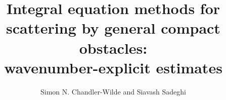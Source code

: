 \documentclass{birkjour}
\theoremstyle{definition}
\theoremstyle{remark}
\numberwithin{equation}{section}
\begin{document}
\title[Wavenumber-explicit estimates in scattering]{Integral equation methods for\\scattering by general compact obstacles:\\ wavenumber-explicit estimates}
\author[S. N. Chandler-Wilde and S. Sadeghi]{Simon N. Chandler-Wilde and Siavash Sadeghi}
\address{Department of Mathematics and Statistics,\\ University of Reading,\\ Whiteknights PO Box 220,\\ Reading RG6 6AX,\\ UK}
\end{document}

